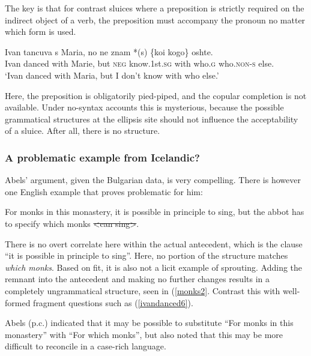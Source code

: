 \documentclass{turabian-researchpaper}
\begin{document}
The key is that for contrast sluices where a preposition is strictly required on the indirect object of a verb, the preposition must accompany the pronoun no matter which form is used. 

\begin{exe}
\ex\label{ivanleft4}
\gll Ivan tancuva s Maria, no ne  znam *(s) \{koi \textbar kogo\} oshte. \\
Ivan danced  with Marie, but \textsc{neg} know.1st.\textsc{sg} with who.\textsc{g} who.\textsc{non-s} else. \\
\trans `Ivan danced with Maria, but I don't know with who else.'
\end{exe}


Here, the preposition is obligatorily pied-piped, and the copular completion is not available. Under no-syntax accounts this is mysterious, because the possible grammatical structures at the ellipsis site should not influence the acceptability of a sluice. After all, there is no structure. 

\subsubsection{A problematic example from Icelandic?}
Abels' argument, given the Bulgarian data, is very compelling. There is however one English example that proves problematic for him: 

\begin{exe}
\ex\label{monks1}
For monks in this monastery, it is possible in principle to sing, but the abbot has to specify which monks \sout{\textless can sing\textgreater}.
\end{exe}

There is no overt correlate here within the actual antecedent, which is the clause ``it is possible in principle to sing''. Here, no portion of the structure matches \textit{which monks}. Based on fit, it is also not a licit example of sprouting. Adding the remnant into the antecedent and making no further changes results in a completely ungrammatical structure, seen in (\ref{monks2}. Contrast this with well-formed fragment questions such as (\ref{ivandanced6}). 

\begin{exe}
\end{exe}

Abels (p.c.) indicated that it may be possible to substitute ``For monks in this monastery'' with ``For which monks'', but also noted that this may be more difficult to reconcile in a case-rich language. 
\end{document}
